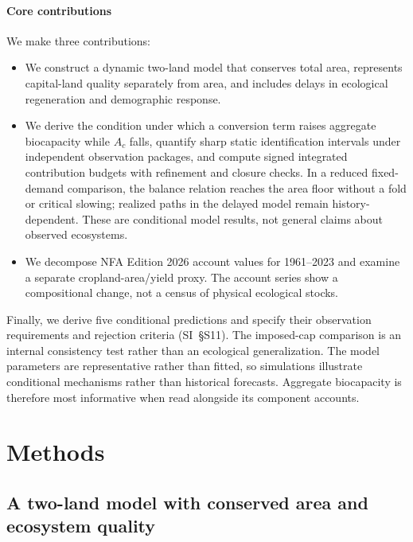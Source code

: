 \documentclass[preprint,12pt,authoryear]{elsarticle}
\begin{document}
\paragraph{Core contributions} We make three contributions:
\begin{itemize}
  \item We construct a dynamic two-land model that conserves total area, represents capital-land quality separately from area, and includes delays in ecological regeneration and demographic response.
  \item We derive the condition under which a conversion term raises aggregate biocapacity while $A_c$ falls, quantify sharp static identification intervals under independent observation packages, and compute signed integrated contribution budgets with refinement and closure checks. In a reduced fixed-demand comparison, the balance relation reaches the area floor without a fold or critical slowing; realized paths in the delayed model remain history-dependent. These are conditional model results, not general claims about observed ecosystems.
  \item We decompose NFA Edition 2026 account values for 1961--2023 and examine a separate cropland-area/yield proxy. The account series show a compositional change, not a census of physical ecological stocks.
\end{itemize}

Finally, we derive five conditional predictions and specify their observation requirements and rejection criteria (SI~\S S11). The imposed-cap comparison is an internal consistency test rather than an ecological generalization. The model parameters are representative rather than fitted, so simulations illustrate conditional mechanisms rather than historical forecasts. Aggregate biocapacity is therefore most informative when read alongside its component accounts.

\section{Methods}\label{sec:model}

\subsection{A two-land model with conserved area and ecosystem quality}\label{sec:equations}
\end{document}
